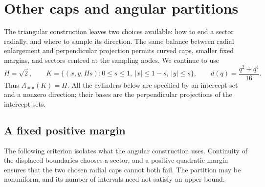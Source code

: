 \section{Other caps and angular partitions}
\label{ext:cap-section}

The triangular construction leaves two choices available: how to end a
sector radially, and where to sample its direction.  The same balance
between radial enlargement and perpendicular projection permits curved
caps, smaller fixed margins, and sectors centred at the sampling nodes.
We continue to use
\[
 H=\sqrt2,\qquad
 K=\{(x,y,Hs):0\le s\le1,\ |x|\le1-s,\ |y|\le s\},
 \qquad d(q)=\frac{q^2+q^4}{16}.
\]
Thus $A_{\min}(K)=H$.  All the cylinders below are specified by an
intercept set and a nonzero direction; their bases are the perpendicular
projections of the intercept sets.

\subsection{A fixed positive margin}

The following criterion isolates what the angular construction uses.
Continuity of the displaced boundaries chooses a sector, and a positive
quadratic margin ensures that the two chosen radial caps cannot both fail.
The partition may be nonuniform, and its number of intervals need not
satisfy an upper bound.


